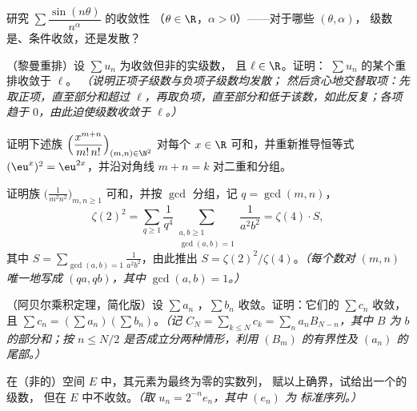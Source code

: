 \begin{exercise}[$\star\star$]\label{exo:b2:series:4}
研究 $\sum \dfrac{\sin(n\theta)}{n^\alpha}$ 的收敛性
（$\theta \in \R$，$\alpha > 0$）——对于哪些 $(\theta, \alpha)$，
级数是、条件收敛，还是发散？
\end{exercise}

\begin{exercise}[$\star\star\star$]\label{exo:b2:series:5}
（黎曼重排）设 $\sum u_n$ 为收敛但非的实级数，
且 $\ell \in \R$。证明：
$\sum u_n$ 的某个重排收敛于 $\ell$。
\emph{（说明正项子级数与负项子级数均发散；
然后贪心地交替取项：先取正项，直至部分和超过
$\ell$，再取负项，直至部分和低于该数，如此反复；各项趋于
$0$，由此迫使级数收敛于 $\ell$。）}
\end{exercise}

\begin{exercise}[$\star\star$]\label{exo:b2:series:6}
证明下述族
$\Bigl(\dfrac{x^{m+n}}{m!\,n!}\Bigr)_{(m,n)\in\N^2}$ 对每个
$x \in \R$ 可和，并重新推导恒等式 $(\eu^x)^2 =
\eu^{2x}$，并沿对角线 $m + n =
k$ 对二重和分组。
\end{exercise}

\begin{exercise}[$\star\star$]\label{exo:b2:series:7}
证明族 $\bigl(\frac{1}{m^2 n^2}\bigr)_{m,n \geq 1}$
可和，并按 $\gcd$ 分组，记 $q = \gcd(m,n)$，
\[
\zeta(2)^2 = \sum_{q\geq1} \frac{1}{q^4}
\sum_{\substack{a,b \geq 1\\ \gcd(a,b)=1}} \frac{1}{a^2b^2}
= \zeta(4) \cdot S,
\]
其中 $S = \sum_{\gcd(a,b)=1} \frac{1}{a^2b^2}$，由此推出 $S =
\zeta(2)^2/\zeta(4)$。\emph{（每个数对 $(m,n)$ 唯一地写成
$(qa, qb)$，其中 $\gcd(a,b) = 1$。）}
\end{exercise}

\begin{exercise}[$\star\star\star$]\label{exo:b2:series:8}
（阿贝尔乘积定理，简化版）设 $\sum a_n$
，$\sum b_n$ 收敛。证明：它们的
 $\sum c_n$ 收敛，且 $\sum c_n = (\sum
a_n)(\sum b_n)$。\emph{（记 $C_N = \sum_{k\leq N} c_k = \sum_n
a_n B_{N-n}$，其中 $B$ 为 $b$ 的部分和；按
$n \leq N/2$ 是否成立分两种情形，利用 $(B_m)$ 的有界性及
$(a_n)$ 的尾部。）}
\end{exercise}

\begin{exercise}[$\star\star\star$]\label{exo:b2:series:9}
在（非的）空间 $E$ 中，其元素为最终为零的实数列，
赋以上确界，试给出一个的级数，
但在 $E$ 中不收敛。\emph{（取 $u_n = 2^{-n} e_n$，其中 $(e_n)$ 为
标准序列。）}
\end{exercise}

